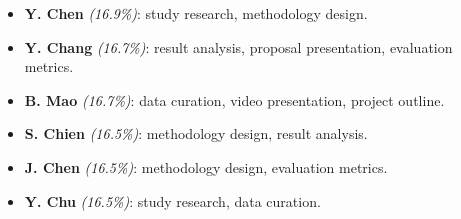\documentclass[conference]{IEEEtran}
\begin{document}
\begin{itemize}
  \item \textbf{Y. Chen} \textit{(16.9\%)}: study research, methodology design.
  \item \textbf{Y. Chang} \textit{(16.7\%)}: result analysis, proposal presentation, evaluation metrics.
  \item \textbf{B. Mao} \textit{(16.7\%)}: data curation, video presentation, project outline.
  \item \textbf{S. Chien} \textit{(16.5\%)}: methodology design, result analysis.
  \item \textbf{J. Chen} \textit{(16.5\%)}: methodology design, evaluation metrics.
  \item \textbf{Y. Chu} \textit{(16.5\%)}: study research, data curation.
\end{itemize}



\end{document}

